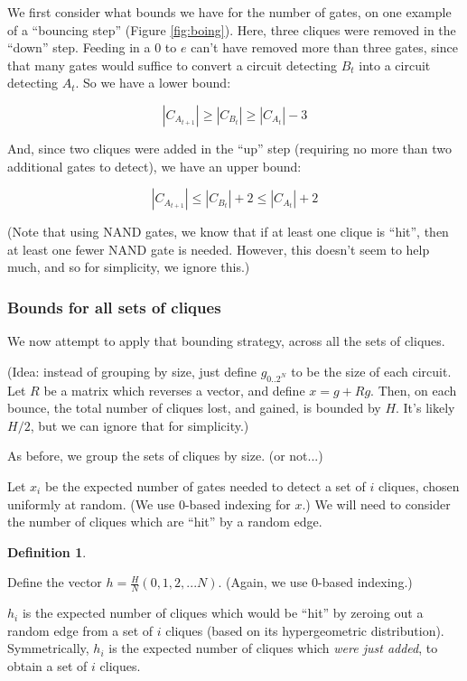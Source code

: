 \documentclass[12pt]{article}
\theoremstyle{definition}
\newtheorem{defn}{Definition}[section]
\begin{document}
We first consider what bounds we have for the number of gates,
on one example of a ``bouncing step'' (Figure \ref{fig:boing}).
Here, three cliques were removed in the ``down'' step. Feeding in a 0
to $e$ can't have removed more than three gates, since that many gates would suffice
to convert a circuit detecting $B_t$ into a circuit detecting $A_t$.
So we have a lower bound:

\[
|C_{A_{t+1}}| \ge |C_{B_t}| \ge |C_{A_t}| - 3
\]

And, since two cliques were added in the ``up'' step (requiring no more than two
additional gates to detect), we have an upper bound:

\[
|C_{A_{t+1}}| \le |C_{B_t}| + 2 \le |C_{A_t}| + 2
\]

(Note that using NAND gates, we know that if at least one clique is ``hit'', then
at least one fewer NAND gate is needed. However, this doesn't seem to help much,
and so for simplicity, we ignore this.)

\subsubsection{Bounds for all sets of cliques}

We now attempt to apply that bounding strategy, across all the sets of cliques.

(Idea: instead of grouping by size, just define $g_{0..2^N}$ to be the size of each circuit.
Let $R$ be a matrix which reverses a vector, and define $x = g + Rg$. Then,
on each bounce, the total number of cliques lost, and gained, is bounded by $H$.
It's likely $H/2$, but we can ignore that for simplicity.)

As before, we group the sets of cliques by size. (or not...)

Let $x_i$ be the expected number of gates needed to detect a set
of $i$ cliques, chosen uniformly at random. (We use 0-based indexing
for $x$.) We will need to consider the number of cliques which are ``hit''
by a random edge.

\begin{defn} \label{defn:sequenceVector}

Define the vector $h = \frac{H}{N}(0, 1, 2, ... N)$. (Again, we use 0-based indexing.)

$h_i$ is the expected number of cliques which would be ``hit'' by zeroing out a random edge
from a set of $i$ cliques (based on its hypergeometric distribution).
Symmetrically, $h_i$ is the expected number of cliques which {\em were just added}, to obtain a
set of $i$ cliques.

\end{defn}
\end{document}
